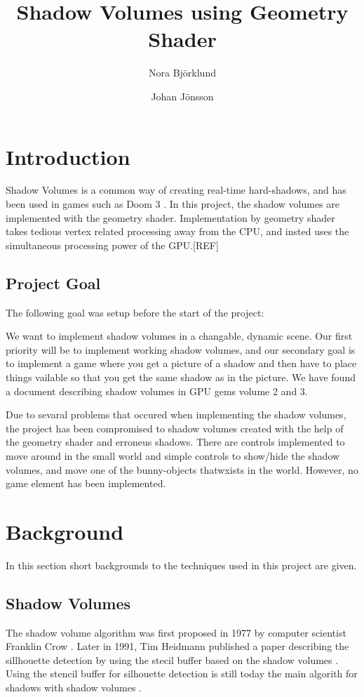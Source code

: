 \documentclass[a4paper, 12pt]{article}
\title{Shadow Volumes using Geometry Shader}
\author{Nora Björklund \and Johan Jönsson}
\begin{document}
\maketitle
\tableofcontents
\newpage
\section{Introduction}
Shadow Volumes is a common way of creating real-time hard-shadows, and has been used in games such as Doom 3 \cite{gpug1}. In this project, the shadow volumes are implemented with the geometry shader. Implementation by geometry shader takes tedious vertex related processing away from the CPU, and insted uses the simultaneous processing power of the GPU.[REF]
\subsection{Project Goal}
The following goal was setup before the start of the project:
\begin{displayquote}
We want to implement shadow volumes in a changable, dynamic scene. Our first priority will be to implement working shadow volumes, and our secondary goal is to implement a game where you get a picture of a shadow and then have to place things vailable so that you get the same shadow as in the picture. We have found a document describing shadow volumes in GPU gems volume 2 and 3.
\end{displayquote}

Due to sevaral problems that occured when implementing the shadow volumes, the project has been compromised to shadow volumes created with the help of the geometry shader and erroneus shadows. There are controls implemented to move around in the small world and simple controls to show/hide the shadow volumes, and move one of the bunny-objects thatwxists in the world. However, no game element has been implemented.
\section{Background}
In this section short backgrounds to the techniques used in this project are given.
\subsection{Shadow Volumes}
The shadow volume algorithm was first proposed in 1977 by computer scientist Franklin Crow \cite{CROW77}. Later in 1991, Tim Heidmann published a paper describing the sillhouette detection by using the stecil buffer based on the shadow volumes \cite{HEIDMANN91}. Using the stencil buffer for silhouette detection is still today the main algorith for shadows with shadow volumes \cite{KOLIVAND13}. 
\end{document}
